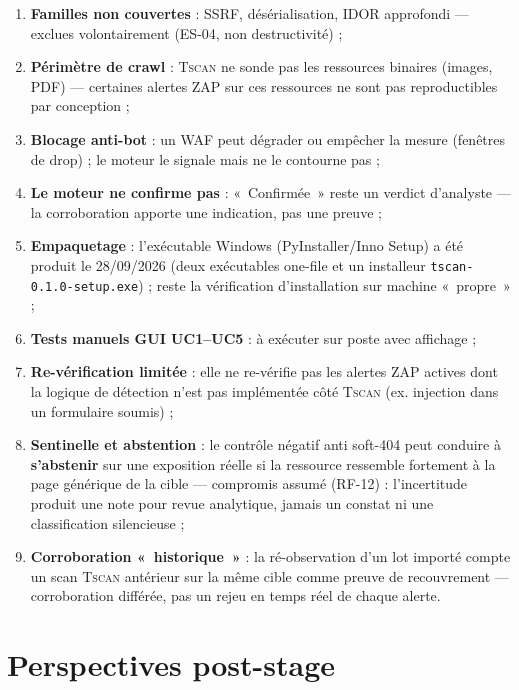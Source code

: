 \documentclass[11pt,a4paper]{report}
\newcommand{\tscan}{\textsc{Tscan}}
\newcommand{\code}[1]{\texttt{#1}}
\begin{document}
\begin{enumerate}[leftmargin=1.8em]
  \item \textbf{Familles non couvertes} : SSRF, désérialisation, IDOR approfondi ---
        exclues volontairement (ES-04, non destructivité) ;
  \item \textbf{Périmètre de crawl} : \tscan{} ne sonde pas les ressources binaires
        (images, PDF) --- certaines alertes ZAP sur ces ressources ne sont pas
        reproductibles par conception ;
  \item \textbf{Blocage anti-bot} : un WAF peut dégrader ou empêcher la mesure (fenêtres
        de drop) ; le moteur le signale mais ne le contourne pas ;
  \item \textbf{Le moteur ne confirme pas} : «~Confirmée~» reste un verdict d'analyste ---
        la corroboration apporte une indication, pas une preuve ;
  \item \textbf{Empaquetage} : l'exécutable Windows (PyInstaller/Inno Setup) a été
        produit le 28/09/2026 (deux exécutables one-file et un installeur
        \code{tscan-0.1.0-setup.exe}) ; reste la vérification d'installation sur machine
        «~propre~» ;
  \item \textbf{Tests manuels GUI UC1--UC5} : à exécuter sur poste avec affichage ;
  \item \textbf{Re-vérification limitée} : elle ne re-vérifie pas les alertes ZAP actives
        dont la logique de détection n'est pas implémentée côté \tscan{} (ex. injection
        dans un formulaire soumis) ;
  \item \textbf{Sentinelle et abstention} : le contrôle négatif anti soft-404 peut
        conduire à \textbf{s'abstenir} sur une exposition réelle si la ressource ressemble
        fortement à la page générique de la cible --- compromis assumé (RF-12) :
        l'incertitude produit une note pour revue analytique, jamais un constat ni une
        classification silencieuse ;
  \item \textbf{Corroboration «~historique~»} : la ré-observation d'un lot importé compte
        un scan \tscan{} antérieur sur la même cible comme preuve de recouvrement ---
        corroboration différée, pas un rejeu en temps réel de chaque alerte.
\end{enumerate}

\chapter{Perspectives post-stage}
\end{document}
